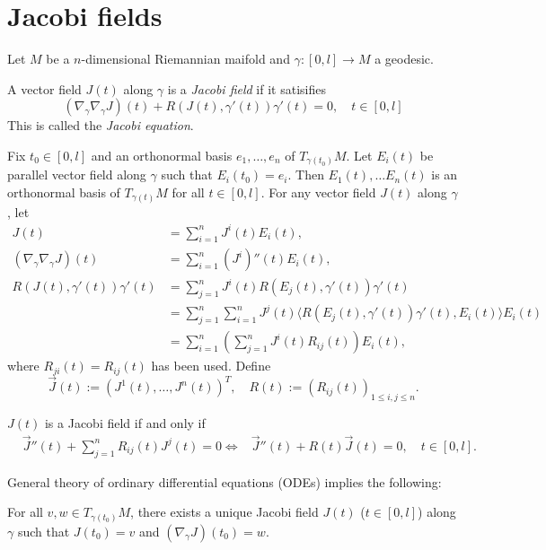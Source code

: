 \section{Jacobi fields}

Let $M$ be a $n$-dimensional Riemannian maifold and $\gamma:[0,l]\to M$ a geodesic.

\begin{definition}\label{def:12.1}
A vector field $J(t)$ along $\gamma$ is a \emph{Jacobi field}
if it satisifies
\[
(\nabla_{\gamma}\nabla_{\gamma}J)(t) + R(J(t),\gamma'(t))\gamma'(t) = 0, \quad t \in [0,l]
\]
This is called the \emph{Jacobi equation}.
\end{definition}

Fix $t_0 \in [0,l]$ and an orthonormal basis $e_1, \dots, e_n$ of $T_{\gamma(t_0)}M$.
Let $E_i(t)$ be parallel vector field along $\gamma$ such that
$E_i(t_0) = e_i$. Then $E_1(t), \dots E_n(t)$ is an orthonormal basis of $T_{\gamma(t)}M$ for all $t \in [0,l]$.
For any vector field $J(t)$ along $\gamma$, let
\[
\begin{aligned}
J(t) &= \sum_{i=1}^nJ^i(t) E_i(t), \\
(\nabla_{\gamma}\nabla_{\gamma}J)(t) &= \sum_{i=1}^n(J^i)''(t)E_i(t), \\
R(J(t), \gamma'(t))\gamma'(t) &= \sum_{j=1}^nJ^i(t) R(E_j(t), \gamma'(t))\gamma'(t) \\
&= \sum_{j=1}^n\sum_{i=1}^nJ^j(t)\langle R(E_j(t), \gamma'(t))\gamma'(t), E_i(t)\rangle E_i(t) \\
&= \sum_{i=1}^n\left(\sum_{j=1}^n J^i(t)R_{ij}(t)\right)E_i(t),
\end{aligned}
\]
where $R_{ji}(t) = R_{ij}(t)$ has been used. Define
\[
\vec{J}(t) := (J^1(t), \dots, J^n(t))^T, \quad R(t) := (R_{ij}(t))_{1\le i,j\le n}.
\]

\begin{proposition}\label{prop:12.2}
$J(t)$ is a Jacobi field if and only if
\[
\begin{aligned}
&\vec{J}''(t) + \sum_{j=1}^nR_{ij}(t)J^j(t) = 0
\Leftrightarrow &\vec{J}''(t) + R(t)\vec{J}(t) = 0, \quad t \in [0,l].
\end{aligned}
\]
\end{proposition}

General theory of ordinary differential equations (ODEs) implies the following:
\begin{corollary}\label{cor:12.3}
For all $v, w \in T_{\gamma(t_0)}M$, there exists a unique Jacobi field $J(t)$ ($t \in [0,l]$) along $\gamma$ such that $J(t_0) = v$ and $(\nabla_{\gamma}J)(t_0) = w$.
\end{corollary}

